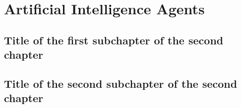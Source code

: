 \chapter{Artificial Intelligence Agents}

\section{Title of the first subchapter of the second chapter}

\section{Title of the second subchapter of the second chapter}
